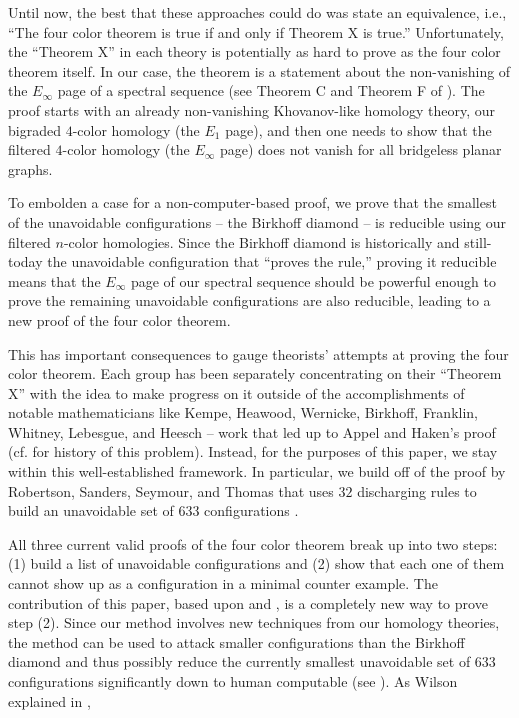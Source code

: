 \documentclass[12pt]{amsart}
\theoremstyle{definition}
\theoremstyle{remark}
\numberwithin{equation}{section}
\begin{document}
Until now, the best that these approaches could do was state an equivalence, i.e., ``The four color theorem is true if and only if  Theorem X is true.'' Unfortunately, the ``Theorem X'' in each theory is potentially as hard to prove as the four color theorem itself. In our case, the theorem is a statement about the non-vanishing of the  $E_\infty$ page of a spectral sequence (see Theorem C and Theorem F of \cite{BMcC}). The proof starts with an already non-vanishing  Khovanov-like homology theory, our bigraded $4$-color homology (the $E_1$ page), and then one needs to show that  the filtered $4$-color homology  (the $E_\infty$ page) does not vanish for all bridgeless planar graphs. 

To embolden a case for a non-computer-based proof, we prove that the smallest of the unavoidable  configurations -- the Birkhoff diamond -- is reducible using our filtered $n$-color homologies.  Since the Birkhoff diamond is historically and still-today the unavoidable configuration that  ``proves the rule,'' proving it reducible means that the $E_\infty$ page of our spectral sequence should be powerful enough to prove the remaining  unavoidable configurations are also reducible, leading to a new proof of the four color theorem. 

This has important consequences to gauge theorists' attempts at proving the four color theorem. Each group has been separately concentrating on their ``Theorem X''  with the idea to make progress on it outside of the accomplishments of notable mathematicians like Kempe, Heawood, Wernicke, Birkhoff, Franklin, Whitney, Lebesgue, and Heesch -- work that led up to  Appel and Haken's proof (cf. \cite{Wilson, Wilson4CS, WWP} for history of this problem). Instead, for the purposes of this paper, we stay within this well-established framework. In particular, we build off of the proof by Robertson, Sanders, Seymour, and Thomas  that uses $32$ discharging rules to build an unavoidable set of $633$ configurations \cite{RSST}. 

All three current valid proofs of the four color theorem  \cite{AppelHaken,AppelHaken2,RSST,Stromquist} break up into two steps: (1) build a list of unavoidable configurations and (2) show that each one of them cannot show up as a configuration in a minimal counter example. The contribution of this paper, based upon \cite{BaldCohomology} and \cite{BMcC}, is a completely new way to prove step (2). Since our method involves new techniques from our homology theories, the method can be used to attack smaller configurations than the Birkhoff diamond and thus possibly reduce the currently smallest unavoidable set of 633 configurations significantly down to human computable (see ).   As Wilson explained in \cite{Wilson}, 
\end{document}
